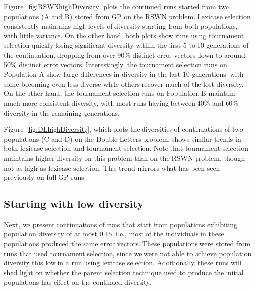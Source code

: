 \documentclass{sig-alternate-05-2015}
\begin{document}
Figure~\ref{fig:RSWNhighDiversity} plots the continued runs started from two populations (A and B) stored from GP on the RSWN problem. Lexicase selection consistently maintains high levels of diversity starting from both populations, with little variance. On the other hand, both plots show runs using tournament selection quickly losing significant diversity within the first 5 to 10 generations of the continuation, dropping from over 90\% distinct error vectors down to around 50\% distinct error vectors. Interestingly, the tournament selection runs on Population A show large differences in diversity in the last 10 generations, with some becoming even less diverse while others recover much of the lost diversity. On the other hand, the tournament selection runs on Population B maintain much more consistent diversity, with most runs having between 40\% and 60\% diversity in the remaining generations.

Figure~\ref{fig:DLhighDiversity}, which plots the diversities of continuations of two populations (C and D) on the Double Letters problem, shows similar trends in both lexicase selection and tournament selection. Note that tournament selection maintains higher diversity on this problem than on the RSWN problem, though not as high as lexicase selection. This trend mirrors what has been seen previously on full GP runs \cite{Helmuth:2015:GPTP}.




\subsection{Starting with low diversity}
\label{sec:lowDiversityResults}

Next, we present continuations of runs that start from populations exhibiting population diversity of at most 0.15, i.e., most of the individuals in these populations produced the same error vectors. These populations were stored from runs that used tournament selection, since we were not able to achieve population diversity this low in a run using lexicase selection. Additionally, these runs will shed light on whether the parent selection technique used to produce the initial populations has effect on the continued diversity.
\end{document}
